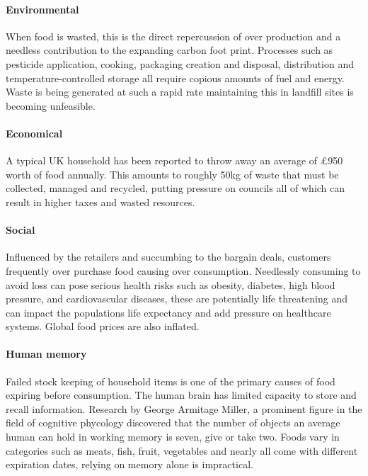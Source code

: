 \documentclass[a4paper, 11pt]{article}
\begin{document}
\paragraph{Environmental}When food is wasted, this is the direct repercussion of over production and a needless contribution to the expanding carbon foot print. Processes such as pesticide application, cooking, packaging creation and disposal, distribution and temperature-controlled storage all require copious amounts of fuel and energy. Waste is being generated at such a rapid rate maintaining this in landfill sites is becoming unfeasible.\cite{waste}

\paragraph{Economical}A typical UK household has been reported to throw away an average of \pounds950 worth of food annually. This amounts to roughly 50kg of waste that must be collected, managed and recycled, putting pressure on councils all of which can result in higher taxes and wasted resources.\cite{FoodWaste}

\paragraph{Social} Influenced by the retailers and succumbing to the bargain deals, customers frequently over purchase food causing over consumption. Needlessly consuming to avoid loss can pose serious health risks such as obesity, diabetes, high blood pressure, and cardiovascular diseases, these are potentially life threatening and can impact the populations life expectancy and add pressure on healthcare systems. Global food prices are also inflated.\cite{obesity}

\paragraph{Human memory}Failed stock keeping of household items is one of the primary causes of food expiring before consumption. The human brain has limited capacity to store and recall information. Research by George Armitage Miller, a prominent figure in the field of cognitive phycology discovered that the number of objects an average human can hold in working memory is seven, give or take two.\cite{memory} Foods vary in categories such as meats, fish, fruit, vegetables and nearly all come with different expiration dates, relying on memory alone is impractical. 
\end{document}
